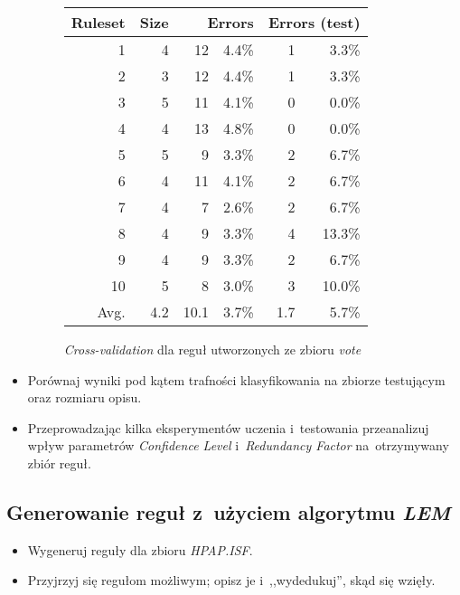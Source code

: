 \documentclass{article}
\begin{document}
\begin{itemize}
\begin{figure}
\begin{tabular}{|r|r|rr|rr|}
\hline
 Ruleset & 
 Size & 
 \multicolumn{2}{1|}{Errors} & 
 \multicolumn{2}{1|}{Errors (test)} \\
\hline\hline
       1 &    4 &   12 & 4.4\% &    1 &  3.3\% \\
       2 &    3 &   12 & 4.4\% &    1 &  3.3\% \\
       3 &    5 &   11 & 4.1\% &    0 &  0.0\% \\
       4 &    4 &   13 & 4.8\% &    0 &  0.0\% \\
       5 &    5 &    9 & 3.3\% &    2 &  6.7\% \\
       6 &    4 &   11 & 4.1\% &    2 &  6.7\% \\
       7 &    4 &    7 & 2.6\% &    2 &  6.7\% \\
       8 &    4 &    9 & 3.3\% &    4 & 13.3\% \\
       9 &    4 &    9 & 3.3\% &    2 &  6.7\% \\
      10 &    5 &    8 & 3.0\% &    3 & 10.0\% \\
\hline\hline
    Avg. &  4.2 & 10.1 & 3.7\% &  1.7 &  5.7\% \\
\hline
\end{tabular}
\caption{\emph{Cross-validation} dla reguł utworzonych ze zbioru \emph{vote}}
\label{p2t2-vote-rules-cv}
\end{figure}

\item Porównaj wyniki pod kątem trafności klasyfikowania na zbiorze testującym oraz rozmiaru opisu.
\item Przeprowadzając kilka eksperymentów uczenia i~testowania przeanalizuj wpływ parametrów \emph{Confidence Level} i~\emph{Redundancy Factor} na~otrzymywany zbiór reguł.
\end{itemize}

\subsection{Generowanie reguł z~użyciem algorytmu \emph{LEM}}

\begin{itemize}
\item Wygeneruj reguły dla zbioru \emph{HPAP.ISF}.
\item Przyjrzyj się regułom możliwym; opisz je i~,,wydedukuj'', skąd się wzięły.
\end{itemize}
\end{document}
